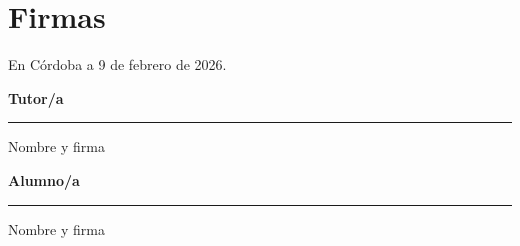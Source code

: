 \chapter*{Firmas}

\vspace{1cm}
\noindent
En Córdoba a 9 de febrero de 2026.

\vspace{3cm}

\noindent
\begin{minipage}[t]{0.48\textwidth}
\centering
\textbf{Tutor/a}\par
\vspace{3.5cm}
\rule{0.9\linewidth}{0.4pt}\par
Nombre y firma
\end{minipage}
\hfill
\begin{minipage}[t]{0.48\textwidth}
\centering
\textbf{Alumno/a}\par
\vspace{3.5cm}
\rule{0.9\linewidth}{0.4pt}\par
Nombre y firma
\end{minipage}

